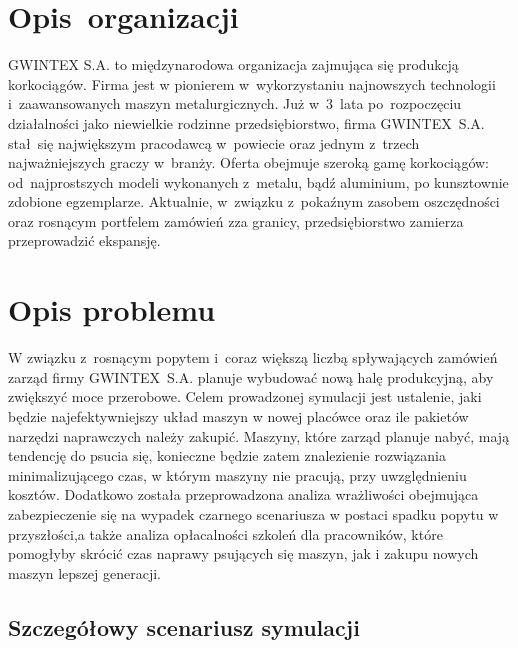 \documentclass[12pt, a4paper, oneside]{mwart} %
\begin{document}
\section{Opis~organizacji}
GWINTEX S.A. to międzynarodowa organizacja zajmująca się produkcją korkociągów. Firma jest w pionierem w~wykorzystaniu najnowszych technologii i~zaawansowanych maszyn metalurgicznych. Już w~3~lata po~rozpoczęciu działalności jako niewielkie rodzinne przedsiębiorstwo, firma GWINTEX~S.A. stał~się największym pracodawcą w~powiecie oraz jednym z~trzech najważniejszych graczy w~branży. Oferta obejmuje szeroką gamę korkociągów: od~najprostszych modeli wykonanych z~metalu, bądź aluminium, po kunsztownie zdobione egzemplarze. Aktualnie, w~związku z~pokaźnym zasobem oszczędności oraz rosnącym portfelem zamówień zza granicy, przedsiębiorstwo zamierza przeprowadzić ekspansję.

\section{Opis problemu}
W związku z~rosnącym popytem i~coraz większą liczbą spływających zamówień zarząd firmy GWINTEX~S.A. planuje wybudować nową halę produkcyjną, aby zwiększyć moce przerobowe. Celem prowadzonej symulacji jest ustalenie, jaki będzie najefektywniejszy układ maszyn w nowej placówce oraz ile pakietów narzędzi naprawczych należy zakupić. Maszyny, które zarząd planuje nabyć, mają tendencję do psucia się, konieczne będzie zatem znalezienie rozwiązania minimalizującego czas, w którym maszyny nie pracują, przy uwzględnieniu kosztów. Dodatkowo została przeprowadzona analiza wrażliwości obejmująca zabezpieczenie się na wypadek czarnego scenariusza w postaci spadku popytu w przyszłości,a także analiza opłacalności szkoleń dla pracowników, które pomogłyby skrócić czas naprawy psujących się maszyn, jak i zakupu nowych maszyn lepszej generacji.

\subsection{Szczegółowy scenariusz symulacji}
\end{document}
